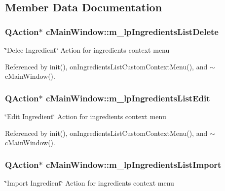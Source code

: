 \subsection{Member Data Documentation}
\subsubsection[{\texorpdfstring{m\+\_\+lp\+Ingredients\+List\+Delete}{m_lpIngredientsListDelete}}]{\setlength{\rightskip}{0pt plus 5cm}Q\+Action$\ast$ c\+Main\+Window\+::m\+\_\+lp\+Ingredients\+List\+Delete\hspace{0.3cm}{\ttfamily [private]}}\hypertarget{classc_main_window_a94ed27f09d49c080ad6e1d7235122a78}{}\label{classc_main_window_a94ed27f09d49c080ad6e1d7235122a78}
\char`\"{}\+Delee Ingredient\char`\"{} Action for ingredients context menu 

Referenced by init(), on\+Ingredients\+List\+Custom\+Context\+Menu(), and $\sim$c\+Main\+Window().

\subsubsection[{\texorpdfstring{m\+\_\+lp\+Ingredients\+List\+Edit}{m_lpIngredientsListEdit}}]{\setlength{\rightskip}{0pt plus 5cm}Q\+Action$\ast$ c\+Main\+Window\+::m\+\_\+lp\+Ingredients\+List\+Edit\hspace{0.3cm}{\ttfamily [private]}}\hypertarget{classc_main_window_a13b40e0849a4897ffffe041a825b8452}{}\label{classc_main_window_a13b40e0849a4897ffffe041a825b8452}
\char`\"{}\+Edit Ingredient\char`\"{} Action for ingredients context menu 

Referenced by init(), on\+Ingredients\+List\+Custom\+Context\+Menu(), and $\sim$c\+Main\+Window().

\subsubsection[{\texorpdfstring{m\+\_\+lp\+Ingredients\+List\+Import}{m_lpIngredientsListImport}}]{\setlength{\rightskip}{0pt plus 5cm}Q\+Action$\ast$ c\+Main\+Window\+::m\+\_\+lp\+Ingredients\+List\+Import\hspace{0.3cm}{\ttfamily [private]}}\hypertarget{classc_main_window_ab62a9cfd83899a679715cb0f0acc254d}{}\label{classc_main_window_ab62a9cfd83899a679715cb0f0acc254d}
\char`\"{}\+Import Ingredient\char`\"{} Action for ingredients context menu 

